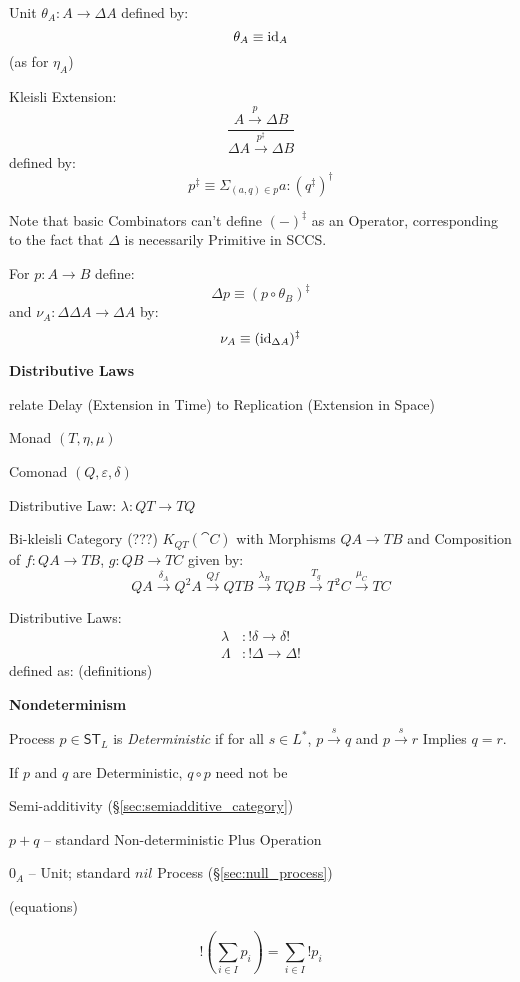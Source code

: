 Unit $\theta_A : A \rightarrow \Delta A$ defined by:
\[
  \theta_A \equiv \mathrm{id}_A
\]
(as for $\eta_A$)

Kleisli Extension:
\[
  \frac{A \xrightarrow{p} \Delta B}
  {\Delta A \xrightarrow{p^\ddag} \Delta B}
\]
defined by:
\[
  p^\ddag \equiv \Sigma_{(a,q) \in p} a : (q^\ddag)^\dag
\]

\fist Note that basic Combinators can't define $(-)^\ddag$ as an
Operator, corresponding to the fact that $\Delta$ is necessarily
Primitive in SCCS.

For $p : A \rightarrow B$ define:
\[
  \Delta p \equiv (p \circ \theta_B)^\ddag
\]
and $\nu_A : \Delta \Delta A \rightarrow \Delta A$ by:
\[
  \nu_A \equiv (\mathrm{id}_{\Delta A})^\ddag
\]


\textbf{Distributive Laws}

relate Delay (Extension in Time) to Replication (Extension in Space)

Monad $(T,\eta,\mu)$

Comonad $(Q,\varepsilon,\delta)$

Distributive Law: $\lambda : Q T \rightarrow T Q$

Bi-kleisli Category (???) $K_{Q T}(\cat{C})$ with Morphisms $Q A
\rightarrow T B$ and Composition of $f : Q A \rightarrow T B$, $g : Q
B \rightarrow T C$ given by:
\[
  Q A \xrightarrow{\delta_A} Q^2 A \xrightarrow{Q f} Q T B
    \xrightarrow{\lambda_B} T Q B \xrightarrow{T_g} T^2 C
    \xrightarrow{\mu_C} T C
\]

Distributive Laws:
\begin{align*}
  \lambda &: !\delta \rightarrow \delta! \\
  \Lambda &: !\Delta \rightarrow \Delta!
\end{align*}
defined as: (definitions) %


\textbf{Nondeterminism}

Process $p \in \mathsf{ST}_L$ is \emph{Deterministic} if for all $s
\in L^*$, $p \xrightarrow{s} q$ and $p \xrightarrow{s} r$ Implies $q =
r$.

If $p$ and $q$ are Deterministic, $q \circ p$ need not be

Semi-additivity (\S\ref{sec:semiadditive_category})

$p+q$ -- standard Non-deterministic Plus Operation

$0_A$ -- Unit; standard $nil$ Process (\S\ref{sec:null_process})

(equations) %

\[
  !(\sum_{i \in I} p_i) = \sum_{i \in I} !p_i
\]

